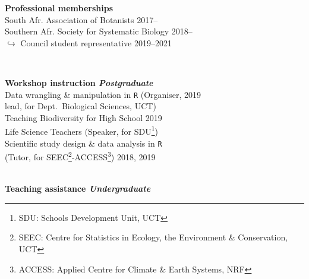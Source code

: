 \documentclass[10pt]{article}
\begin{document}
\begin{multicols}{2} %

\textbf{Professional memberships} \\ %

South Afr. Association of Botanists    \hfill {\small 2017--\hspace*{2.25em}} \\
Southern Afr. Society for Systematic
  Biology                              \hfill {\small 2018--\hspace*{2.25em}} \\
  \hspace{0.75em} {\small
    $\hookrightarrow$ Council student
    representative                     \hfill         2019--2021}

\

\textbf{Workshop instruction %
                              \hfill {\small \textmd{\textit{Postgraduate}}}} \\

Data wrangling \& manipulation in \texttt{R}
  {\small (Organiser,}                             \hfill {\small       2019} \\
  \hspace{2em} {\small lead, for Dept.~Biological
    Sciences, UCT)}                                                           \\
Teaching Biodiversity for High School              \hfill {\small       2019} \\
  \hspace{2em} Life Science Teachers {\small
    (Speaker, for SDU\footnote{SDU: Schools
    Development Unit, UCT})}                                                  \\
Scientific study design \& data analysis in
  \texttt{R}                                                                  \\
  \hspace{2em} {\small(Tutor, for SEEC\footnote{
    SEEC: Centre for Statistics in Ecology, the
    Environment \& Conservation,
    UCT}-ACCESS\footnote{ACCESS: Applied Centre
    for Climate \& Earth Systems, NRF})}           \hfill {\small 2018, 2019} \\

\

\textbf{Teaching assistance %
                             \hfill {\small \textmd{\textit{Undergraduate}}}} \\


\end{multicols}
\end{document}
